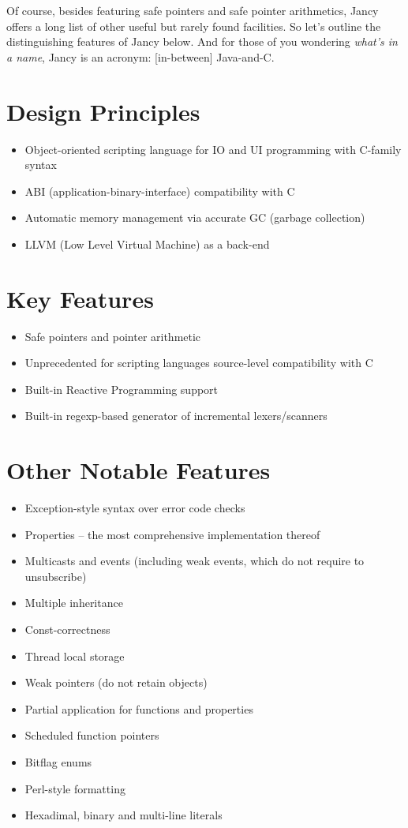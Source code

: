 \documentclass[oneside]{book}
\begin{document}
Of course, besides featuring safe pointers and safe pointer arithmetics, Jancy offers a long list of other useful but rarely found facilities. So let's outline the distinguishing features of Jancy below. And for those of you wondering \emph{what's in a name}, Jancy is an acronym: [in-between] Java-and-C.

\section{Design Principles}

\begin{itemize}
\item Object-oriented scripting language for IO and UI programming with C-family syntax
\item ABI (application-binary-interface) compatibility with C
\item Automatic memory management via accurate GC (garbage collection)
\item LLVM (Low Level Virtual Machine) as a back-end
\end{itemize}

\section{Key Features}

\begin{itemize}
\item Safe pointers and pointer arithmetic
\item Unprecedented for scripting languages source-level compatibility with C
\item Built-in Reactive Programming support
\item Built-in regexp-based generator of incremental lexers/scanners
\end{itemize}

\section{Other Notable Features}

\begin{itemize}
\item Exception-style syntax over error code checks
\item Properties -- the most comprehensive implementation thereof
\item Multicasts and events (including weak events, which do not require to unsubscribe)
\item Multiple inheritance
\item Const-correctness
\item Thread local storage
\item Weak pointers (do not retain objects)
\item Partial application for functions and properties
\item Scheduled function pointers
\item Bitflag enums
\item Perl-style formatting
\item Hexadimal, binary and multi-line literals
\end{itemize}
\end{document}
